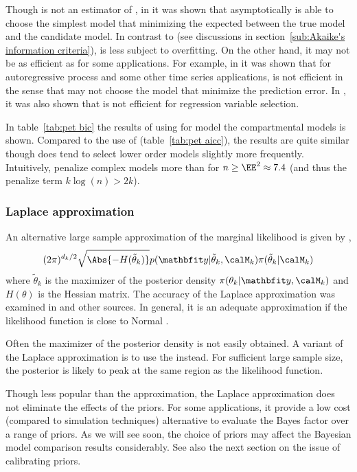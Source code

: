 Though \bic is not an estimator of \kld, in \cite{Sin:1996vs} it was shown
that asymptotically \bic is able to choose the simplest model that minimizing
the expected \kld between the true model and the candidate model. In contrast
to \aic (see discussions in section~\ref{sub:Akaike's information criteria}),
\bic is less subject to overfitting. On the other hand, it may not be as
efficient as \aic for some applications. For example, in \cite{Lee:2001tm} it
was shown that for autoregressive process and some other time series
applications, \bic is not efficient in the sense that \bic may not choose the
model that minimize the prediction error. In
\cite[][sec.~4.7]{Claeskens:2008tq}, it was also shown that \bic is not
efficient for regression variable selection.

In table~\ref{tab:pet bic} the results of using \bic for model the \pet
compartmental models is shown. Compared to the use of \aicc
(table~\ref{tab:pet aicc}), the results are quite similar though \bic does
tend to select lower order models slightly more frequently. Intuitively, \bic
penalize complex models more than \aic for $n\ge\EE^2\approx7.4$ (and thus the
penalize term $k\log(n) > 2k$).



\subsubsection{Laplace approximation}
\label{ssub:Laplace approximation}

An alternative large sample approximation of the marginal likelihood is given
by \cite{Tierney:1986vx},
\begin{equation}
  (2\pi)^{d_k/2}\sqrt{\Abs{-H(\tilde\theta_k)}}
  p(\data|\tilde\theta_k,\calM_k)\pi(\tilde\theta_k|\calM_k)
\end{equation}
where $\tilde\theta_k$ is the maximizer of the posterior density
$\pi(\theta_k|\data,\calM_k)$ and $H(\theta)$ is the Hessian matrix. The
accuracy of the Laplace approximation was examined in \cite{Kass:1992tz} and
other sources. In general, it is an adequate approximation if the likelihood
function is close to Normal \cite{Kass:1995vb}.

Often the maximizer of the posterior density is not easily obtained. A
variant of the Laplace approximation is to use the \mle instead. For
sufficient large sample size, the posterior is likely to peak at the same
region as the likelihood function.

Though less popular than the \bic approximation, the Laplace approximation
does not eliminate the effects of the priors. For some applications, it
provide a low cost (compared to simulation techniques) alternative to evaluate
the Bayes factor over a range of priors. As we will see soon, the choice of
priors may affect the Bayesian model comparison results considerably. See also
the next section on the issue of calibrating priors.

